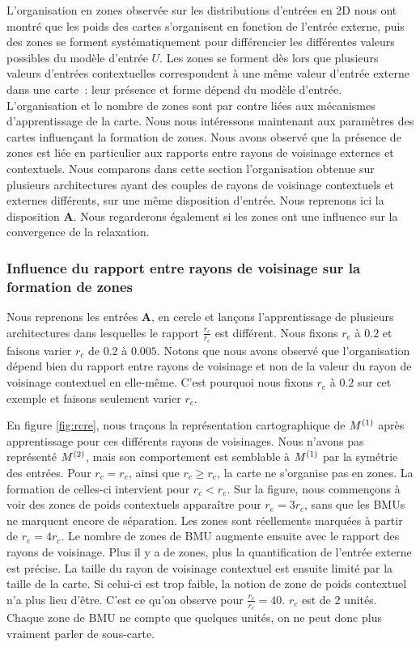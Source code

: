 \documentclass[../main]{subfiles}
\begin{document}
L'organisation en zones observée sur les distributions d'entrées en 2D nous ont montré que les poids des cartes s'organisent en fonction de l'entrée externe, puis des zones se forment systématiquement pour différencier les différentes valeurs possibles du modèle d'entrée $U$. Les zones se forment dès lors que plusieurs valeurs d'entrées contextuelles correspondent à une même valeur d'entrée externe dans une carte~: leur présence et forme dépend du modèle d'entrée.
L'organisation et le nombre de zones sont par contre liées aux mécanismes d'apprentissage de la carte.
Nous nous intéressons maintenant aux paramètres des cartes influençant la formation de zones.
Nous avons observé que la présence de zones est liée en particulier aux rapports entre rayons de voisinage externes et contextuels.
Nous comparons dans cette section l'organisation obtenue sur plusieurs architectures ayant des couples de rayons de voisinage contextuels et externes différents, sur une même disposition d'entrée. Nous reprenons ici la disposition \textbf{A}.
Nous regarderons également si les zones ont une influence sur la convergence de la relaxation.

\subsubsection{Influence du rapport entre rayons de voisinage sur la formation de zones}

Nous reprenons les entrées \textbf{A}, en cercle et lançons l'apprentissage de plusieurs architectures dans lesquelles le rapport $\frac{r_e}{r_c}$ est différent.
Nous fixons $r_e$ à $0.2$ et faisons varier $r_c$ de $0.2$ à $0.005$. 
Notons que nous avons observé que l'organisation dépend bien du rapport entre rayons de voisinage et non de la valeur du rayon de voisinage contextuel en elle-même. 
C'est pourquoi nous fixons $r_e$ à $0.2$ sur cet exemple et faisons seulement varier $r_c$.

En figure \ref{fig:rcre}, nous traçons la représentation cartographique de $M^{({1})}$ après apprentissage pour ces différents rayons de voisinages.  Nous n'avons pas représenté $M^{({2})}$, mais son comportement est semblable à $M^{({1})}$ par la symétrie des entrées.
Pour $r_c = r_e$, ainsi que $r_c \geq r_e$, la carte ne s'organise pas en zones. 
La formation de celles-ci intervient pour $r_c < r_e$. Sur la figure, nous commençons à voir des zones de poids contextuels apparaître pour $r_e = 3r_c$, sans que les BMUs ne marquent encore de séparation. Les zones sont réellements marquées à partir de $r_e = 4r_c$.
Le nombre de zones de BMU augmente ensuite avec le rapport des rayons de voisinage. Plus il y a de zones, plus la quantification de l'entrée externe est précise.
La taille du rayon de voisinage contextuel est ensuite limité par la taille de la carte. Si celui-ci est trop faible, la notion de zone de poids contextuel n'a plus lieu d'être. C'est ce qu'on observe pour $\frac{r_e}{r_c} = 40$. $r_c$ est de $2$ unités. Chaque zone de BMU ne compte que quelques unités, on ne peut donc plus vraiment parler de sous-carte.
\end{document}
